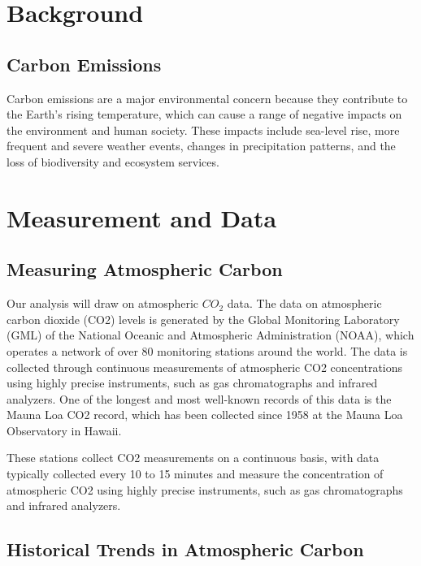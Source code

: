\documentclass[AER]{AEA}
\begin{document}
\hypertarget{background}{%
\section{Background}\label{background}}

\hypertarget{carbon-emissions}{%
\subsection{Carbon Emissions}\label{carbon-emissions}}

Carbon emissions are a major environmental concern because they
contribute to the Earth's rising temperature, which can cause a range of
negative impacts on the environment and human society. These impacts
include sea-level rise, more frequent and severe weather events, changes
in precipitation patterns, and the loss of biodiversity and ecosystem
services.

\hypertarget{measurement-and-data}{%
\section{Measurement and Data}\label{measurement-and-data}}

\hypertarget{measuring-atmospheric-carbon}{%
\subsection{Measuring Atmospheric
Carbon}\label{measuring-atmospheric-carbon}}

Our analysis will draw on atmospheric \(CO_{2}\) data. The data on
atmospheric carbon dioxide (CO2) levels is generated by the Global
Monitoring Laboratory (GML) of the National Oceanic and Atmospheric
Administration (NOAA), which operates a network of over 80 monitoring
stations around the world. The data is collected through continuous
measurements of atmospheric CO2 concentrations using highly precise
instruments, such as gas chromatographs and infrared analyzers. One of
the longest and most well-known records of this data is the Mauna Loa
CO2 record, which has been collected since 1958 at the Mauna Loa
Observatory in Hawaii.

These stations collect CO2 measurements on a continuous basis, with data
typically collected every 10 to 15 minutes and measure the concentration
of atmospheric CO2 using highly precise instruments, such as gas
chromatographs and infrared analyzers.

\hypertarget{historical-trends-in-atmospheric-carbon}{%
\subsection{Historical Trends in Atmospheric
Carbon}\label{historical-trends-in-atmospheric-carbon}}
\end{document}
